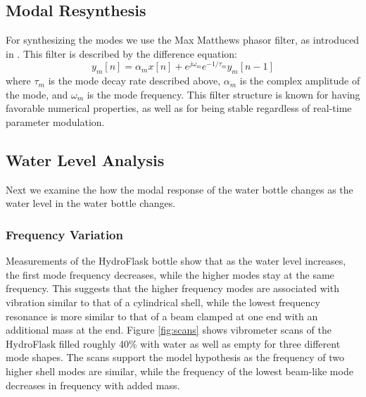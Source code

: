\documentclass[twoside,a4paper]{article}
\begin{document}
%
\subsection{Modal Resynthesis} \label{sec:synthesis}
%
For synthesizing the modes we use the Max Matthews
phasor filter, as introduced in \cite{phasorfilter}.
This filter is described by the difference equation:
\begin{equation}
    y_m[n] = \alpha_m x[n] + e^{j\omega_m} e^{-1/\tau_m} y_m[n-1]
    \label{eq:phasor}
\end{equation}
%
where $\tau_m$ is the mode decay rate described above,
$\alpha_m$ is the complex amplitude of the mode, and $\omega_m$
is the mode frequency. This filter structure is known for
having favorable numerical properties, as well as for being
stable regardless of real-time parameter modulation.
\subsection{Water Level Analysis} \label{sec:water}
%
Next we examine the how the modal response of the water bottle
changes as the water level in the water bottle changes. 
%
\subsubsection{Frequency Variation} \label{sec:water-freq}
%

Measurements of the HydroFlask bottle show that as the water
level increases, the first mode frequency decreases, while the
higher modes stay at the same frequency. This suggests that the higher frequency modes are associated with vibration similar to that of a cylindrical shell, while the lowest frequency resonance is more similar to that of a beam clamped at one end with an additional mass at the end. Figure \ref{fig:scans} shows vibrometer scans of the HydroFlask filled roughly 40\% with water as well as empty for three different mode shapes. The scans support the model hypothesis as the frequency of two higher shell modes are similar, while the frequency of the lowest beam-like mode decreases in frequency with added mass. 
\end{document}
